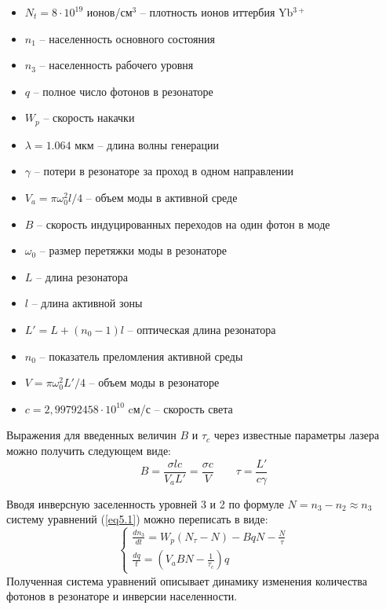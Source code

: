 \documentclass[a4paper, 12pt]{article}
\begin{document}
	\begin{itemize}
		\item $N_t=8\cdot10^{19}$ ионов/см$^3$ -- плотность ионов иттербия Yb$^{3+}$
		\item $n_1$ -- населенность основного состояния
		\item $n_3$ -- населенность рабочего уровня
		\item $q$ -- полное число фотонов в резонаторе
		\item $W_p$ -- скорость накачки
		\item $\lambda=1.064$ мкм -- длина волны генерации
		\item $\gamma$ -- потери в резонаторе за проход в одном направлении
		\item $V_a=\pi\omega_0^2 l/4$ -- объем моды в активной среде
		\item $B$ -- скорость индуцированных переходов на один фотон в моде
		\item $\omega_0$ -- размер перетяжки моды в резонаторе
		\item $L$ -- длина резонатора
		\item $l$ -- длина активной зоны
		\item $L'=L+\left(n_0-1\right)l$ -- оптическая длина резонатора
		\item $n_0$ -- показатель преломления активной среды
		\item $V=\pi\omega_0^2L'/4$ -- объем моды в резонаторе
		\item $c=2,99792458\cdot 10^{10}$ cм/с -- скорость света
	\end{itemize}
	\par
	Выражения для введенных величин $B$ и $\tau_c$ через известные параметры лазера можно получить следующем виде:
	\begin{equation*}
		B=\frac{\sigma l c}{V_aL'}=\frac{\sigma c}{V}\qquad\tau=\frac{L'}{c\gamma}
	\end{equation*}
	\par
	Вводя инверсную заселенность уровней 3 и 2 по формуле $N=n_3-n_2\approx n_3$ систему уравнений (\ref{eq5.1}) можно переписать в виде:
	\begin{equation}
		\begin{cases}
			\frac{dn_3}{dt}=W_p\left(N_\tau-N\right)-BqN-\frac{N}{\tau}\\
			\frac{dq}{t}=\left(V_aBN-\frac{1}{\tau_c}\right)q
		\end{cases}
		\label{eq526}
	\end{equation}
	Полученная система уравнений описывает динамику изменения количества фотонов в резонаторе и инверсии населенности.\par
\end{document}
